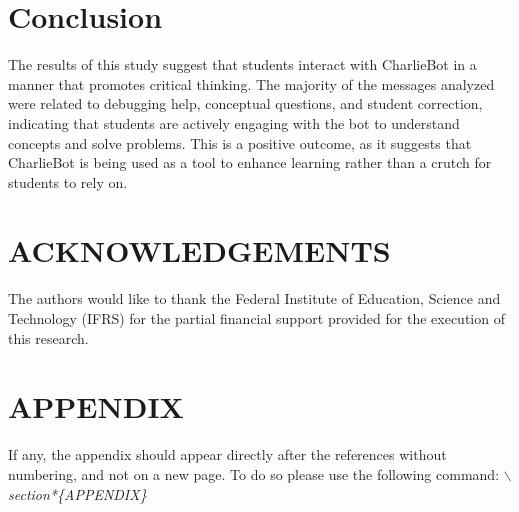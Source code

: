 \documentclass[a4paper,twoside]{article}
\begin{document}

\section{Conclusion}

The results of this study suggest that students interact with CharlieBot in a
manner that promotes critical thinking. The majority of the messages analyzed
were related to debugging help, conceptual questions, and student correction,
indicating that students are actively engaging with the bot to understand
concepts and solve problems. This is a positive outcome, as it suggests that
CharlieBot is being used as a tool to enhance learning rather than a crutch for
students to rely on.

\section*{ACKNOWLEDGEMENTS}

The authors would like to thank the Federal Institute of Education, Science and
Technology (IFRS) for the partial financial support provided for the execution
of this research.


{\small
}

\section*{\uppercase{Appendix}}

If any, the appendix should appear directly after the
references without numbering, and not on a new page. To do so please use the
following command: \textit{$\backslash$section*\{APPENDIX\}}
\end{document}
